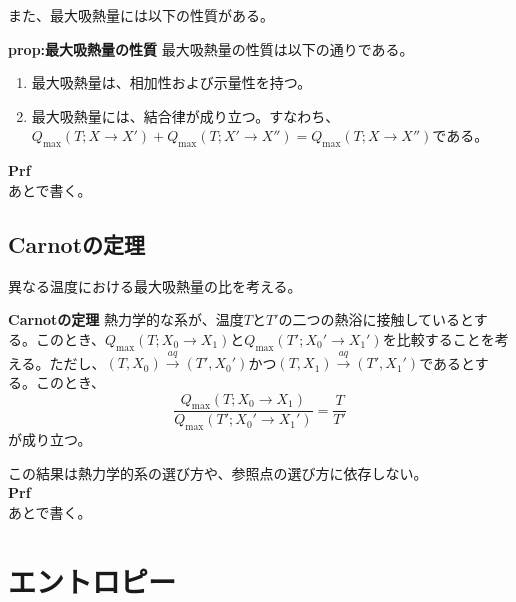 \documentclass[a4paper,11pt]{jsarticle}
\begin{document}
また、最大吸熱量には以下の性質がある。\\
\begin{itembox}[l]{\textbf{prop:最大吸熱量の性質}}
    最大吸熱量の性質は以下の通りである。
    \begin{enumerate}
        \item 最大吸熱量は、相加性および示量性を持つ。
        \item 最大吸熱量には、結合律が成り立つ。すなわち、$Q_{\text{max}}(T;X\rightarrow X')+Q_{\text{max}}(T;X'\rightarrow X'') = Q_{\text{max}}(T;X\rightarrow X'')$である。
    \end{enumerate}
\end{itembox}
\textbf{Prf}\\
あとで書く。\\

\subsection{Carnotの定理}
異なる温度における最大吸熱量の比を考える。\\
\begin{itembox}[l]{\textbf{Carnotの定理}}
    熱力学的な系が、温度$T$と$T'$の二つの熱浴に接触しているとする。このとき、$Q_{\text{max}}(T;X_0\rightarrow X_1)$と$Q_{\text{max}}(T';X_0'\rightarrow X_1')$を比較することを考える。ただし、$(T,X_0)\xrightarrow{aq}(T',X_0')$かつ$(T,X_1)\xrightarrow{aq}(T',X_1')$であるとする。このとき、
    \begin{equation}
        \frac{Q_{\text{max}}(T;X_0\rightarrow X_1)}{Q_{\text{max}}(T';X_0'\rightarrow X_1')} = \frac{T}{T'} 
    \end{equation}
    が成り立つ。
\end{itembox} 
この結果は熱力学的系の選び方や、参照点の選び方に依存しない。\\
\textbf{Prf}\\
あとで書く。\\

\section{エントロピー}
\end{document}
